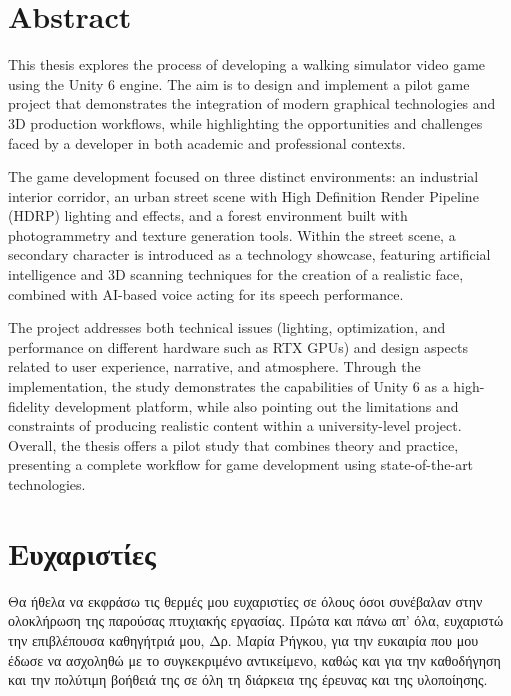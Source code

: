 \chapter*{Abstract}
This thesis explores the process of developing a walking simulator video
game using the Unity 6 engine. The aim is to design and implement a pilot
game project that demonstrates the integration of modern graphical
technologies and 3D production workflows, while highlighting the
opportunities and challenges faced by a developer in both academic and
professional contexts.

The game development focused on three distinct environments: an
industrial interior corridor, an urban street scene with High Definition
Render Pipeline (HDRP) lighting and effects, and a forest environment
built with photogrammetry and texture generation tools. Within the street
scene, a secondary character is introduced as a technology showcase,
featuring artificial intelligence and 3D scanning techniques for the
creation of a realistic face, combined with AI-based voice acting for its
speech performance.

The project addresses both technical issues (lighting, optimization, and
performance on different hardware such as RTX GPUs) and design aspects
related to user experience, narrative, and atmosphere. Through the
implementation, the study demonstrates the capabilities of Unity 6  as a high-fidelity development platform, while also pointing out the
limitations and constraints of producing realistic content within a
university-level project. Overall, the thesis offers a pilot study that
combines theory and practice, presenting a complete workflow for game
development using state-of-the-art technologies.

\tableofcontents
\cleardoublepage

\chapter*{Ευχαριστίες}
Θα ήθελα να εκφράσω τις θερμές μου ευχαριστίες σε όλους όσοι συνέβαλαν
στην ολοκλήρωση της παρούσας πτυχιακής εργασίας. Πρώτα και πάνω απ’ όλα,
ευχαριστώ την επιβλέπουσα καθηγήτριά μου, Δρ. Μαρία Ρήγκου, για την
ευκαιρία που μου έδωσε να ασχοληθώ με το συγκεκριμένο αντικείμενο, καθώς
και για την καθοδήγηση και την πολύτιμη βοήθειά της σε όλη τη διάρκεια
της έρευνας και της υλοποίησης.

